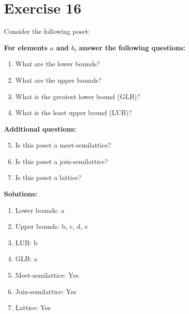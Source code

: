 \documentclass{article}
\begin{document}
\section*{Exercise 16}
Consider the following poset:
\begin{center}
\end{center}

    \textbf{For elements $a$ and $b$, answer the following questions:}
\begin{enumerate}
    \item What are the lower bounds?
    \item What are the upper bounds?
    \item What is the greatest lower bound (GLB)?
    \item What is the least upper bound (LUB)?
\end{enumerate}
    \hspace*{3ex} \textbf{Additional questions:}
\begin{enumerate}
    \setcounter{enumi}{4}
    \item Is this poset a meet-semilattice?
    \item Is this poset a join-semilattice?
    \item Is this poset a lattice?
\end{enumerate}

\textbf{Solutions:}
\begin{enumerate}
    \item Lower bounds: {a}
    \item Upper bounds: {b, c, d, e}
    \item LUB: b
    \item GLB: a
    \item Meet-semilattice: Yes
    \item Join-semilattice: Yes
    \item Lattice: Yes
\end{enumerate}
\newpage
\end{document}
